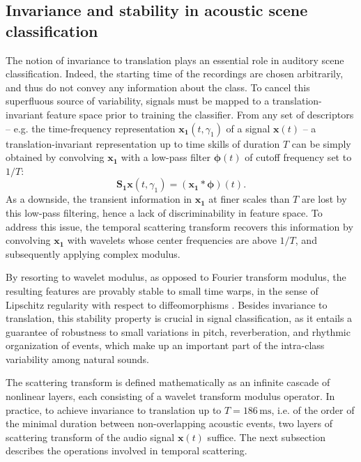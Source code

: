 \documentclass[journal]{IEEEtran}
\makeatletter
\newcommand*{\eg}{e.g.\@\xspace}
\newcommand*{\ie}{i.e.\@\xspace}
\makeatother
\begin{document}
\subsection{Invariance and stability in acoustic scene classification}
The notion of invariance to translation plays an essential role in auditory scene classification.
Indeed, the starting time of the recordings are chosen arbitrarily, and thus do not convey any information about the class.
To cancel this superfluous source of variability, signals must be mapped to a translation-invariant feature space prior to training the classifier.
From any set of descriptors -- \eg the time-frequency representation $\boldsymbol{x_1}(t,\gamma_1)$ of  a signal $\boldsymbol{x}(t)$ --
a translation-invariant representation up to time skills of duration $T$ can be simply obtained
by convolving $\boldsymbol{x_1}$ with a low-pass filter $\boldsymbol{\phi}(t)$ of cutoff frequency
set to $1/T$:
\begin{equation}
\mathbf{S_1}\boldsymbol{x}(t, \gamma_1) = (\boldsymbol{x_1} \ast \boldsymbol{\phi}) (t).
\end{equation}
As a downside, the transient information in $\boldsymbol{x_1}$ at finer scales than $T$ are lost by this low-pass filtering, hence a lack of discriminability in feature space.
To address this issue, the temporal scattering transform recovers this information by convolving $\boldsymbol{x_1}$ with wavelets whose center frequencies are above $1/T$, and subsequently applying complex modulus.

By resorting to wavelet modulus, as opposed to Fourier transform modulus, the resulting features are provably stable to small time warps,
in the sense of Lipschitz regularity with respect to diffeomorphisms \cite{Mallat2012}.
Besides invariance to translation, this stability property is crucial in signal classification, as it entails a guarantee of robustness to small variations in pitch, reverberation, and rhythmic organization of events, which make up an important part of the intra-class variability among natural sounds.

The scattering transform is defined mathematically as an infinite cascade of nonlinear layers, each consisting of a wavelet transform modulus operator.
In practice, to achieve invariance to translation up to $T = 186\,\mathrm{ms}$, \ie of the order of the minimal duration between non-overlapping acoustic events, two layers of scattering transform of the audio signal $\boldsymbol{x}(t)$ suffice.
The next subsection describes the operations involved in temporal scattering.
\end{document}
